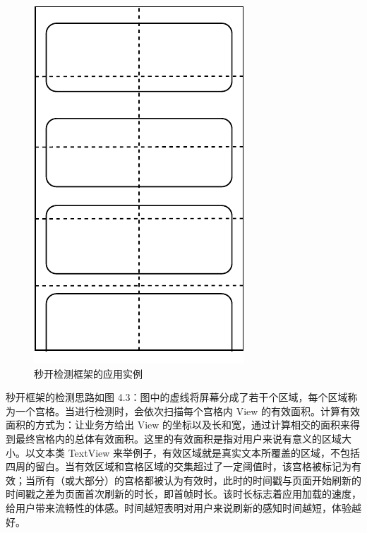 \begin{figure}[H]
    \centering
    \includegraphics{assets/visibility-check.pdf}
    \caption{秒开检测框架的应用实例}
\end{figure}

秒开框架的检测思路如图 4.3：图中的虚线将屏幕分成了若干个区域，每个区域称为一个宫格。当进行检测时，会依次扫描每个宫格内 View 的有效面积。计算有效面积的方式为：让业务方给出 View 的坐标以及长和宽，通过计算相交的面积来得到最终宫格内的总体有效面积。这里的有效面积是指对用户来说有意义的区域大小。以文本类 TextView 来举例子，有效区域就是真实文本所覆盖的区域，不包括四周的留白。当有效区域和宫格区域的交集超过了一定阈值时，该宫格被标记为有效；当所有（或大部分）的宫格都被认为有效时，此时的时间戳与页面开始刷新的时间戳之差为页面首次刷新的时长，即首帧时长。该时长标志着应用加载的速度，给用户带来流畅性的体感。时间越短表明对用户来说刷新的感知时间越短，体验越好。


